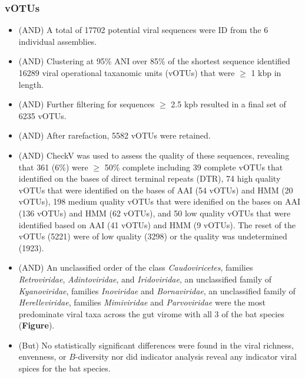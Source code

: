 \documentclass[
]{article}
\providecommand{\tightlist}{%
  \setlength{\itemsep}{0pt}\setlength{\parskip}{0pt}}
\begin{document}
\subsubsection{vOTUs}\label{votus}

\begin{itemize}
\tightlist
\item
  (AND) A total of 17702 potential viral sequences were ID from the 6
  individual assemblies.
\item
  (AND) Clustering at 95\% ANI over 85\% of the shortest sequence
  identified 16289 viral operational taxanomic units (vOTUs) that were
  \(\geq\) 1 kbp in length.
\item
  (AND) Further filtering for sequences \(\geq\) 2.5 kpb resulted in a
  final set of 6235 vOTUs.
\item
  (AND) After rarefaction, 5582 vOTUs were retained.
\item
  (AND) CheckV was used to assess the quality of these sequences,
  revealing that 361 (6\%) were \(\geq\) 50\% complete including 39
  complete vOTUs that identified on the bases of direct terminal repeats
  (DTR), 74 high quality vOTUs that were identified on the bases of AAI
  (54 vOTUs) and HMM (20 vOTUs), 198 medium quality vOTUs that were
  idenified on the bases on AAI (136 vOTUs) and HMM (62 vOTUs), and 50
  low quality vOTUs that were identified based on AAI (41 vOTUs) and HMM
  (9 vOTUs). The reset of the vOTUs (5221) were of low quality (3298) or
  the quality was undetermined (1923).
\item
  (AND) An unclassified order of the class \emph{Caudoviricetes},
  families \emph{Retroviridae}, \emph{Adintoviridae}, and
  \emph{Iridoviridae}, an unclassified family of \emph{Kyanoviridae},
  families \emph{Inoviridae} and \emph{Bornaviridae}, an unclassified
  family of \emph{Herelleviridae}, families \emph{Mimiviridae} and
  \emph{Parvoviridae} were the most predominate viral taxa across the
  gut virome with all 3 of the bat species (\textbf{Figure}).
\item
  (But) No statistically significant differences were found in the viral
  richness, envenness, or \(B\)-diversity nor did indicator analysis
  reveal any indicator viral spices for the bat species.
\end{itemize}
\end{document}
